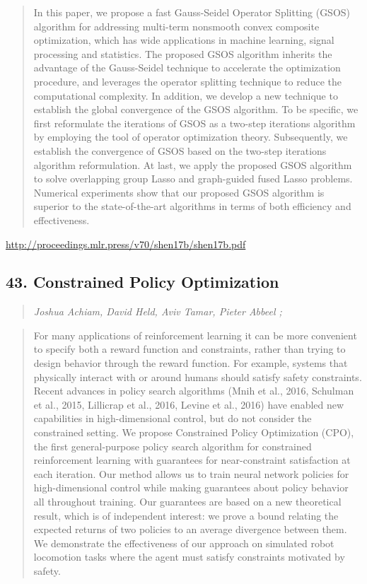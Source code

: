 \documentclass{article}
\begin{document}
\begin{quote}
    In this paper, we propose a fast Gauss-Seidel Operator Splitting (GSOS) algorithm for addressing multi-term nonsmooth convex composite optimization, which has wide applications in machine learning, signal processing and statistics. The proposed GSOS algorithm inherits the advantage of the Gauss-Seidel technique to accelerate the optimization procedure, and leverages the operator splitting technique to reduce the computational complexity. In addition, we develop a new technique to establish the global convergence of the GSOS algorithm. To be specific, we first reformulate the iterations of GSOS as a two-step iterations algorithm by employing the tool of operator optimization theory. Subsequently, we establish the convergence of GSOS based on the two-step iterations algorithm reformulation. At last, we apply the proposed GSOS algorithm to solve overlapping group Lasso and graph-guided fused Lasso problems. Numerical experiments show that our proposed GSOS algorithm is superior to the state-of-the-art algorithms in terms of both efficiency and effectiveness.  
\end{quote}

\href{http://proceedings.mlr.press/v70/shen17b/shen17b.pdf}{http://proceedings.mlr.press/v70/shen17b/shen17b.pdf}

\subsection{43. Constrained Policy Optimization}

\begin{quote}
\footnotesize{\textit{Joshua Achiam, David Held, Aviv Tamar, Pieter Abbeel ;}}

\end{quote}

\begin{quote}
    For many applications of reinforcement learning it can be more convenient to specify both a reward function and constraints, rather than trying to design behavior through the reward function. For example, systems that physically interact with or around humans should satisfy safety constraints. Recent advances in policy search algorithms (Mnih et al., 2016, Schulman et al., 2015, Lillicrap et al., 2016, Levine et al., 2016) have enabled new capabilities in high-dimensional control, but do not consider the constrained setting. We propose Constrained Policy Optimization (CPO), the first general-purpose policy search algorithm for constrained reinforcement learning with guarantees for near-constraint satisfaction at each iteration. Our method allows us to train neural network policies for high-dimensional control while making guarantees about policy behavior all throughout training. Our guarantees are based on a new theoretical result, which is of independent interest: we prove a bound relating the expected returns of two policies to an average divergence between them. We demonstrate the effectiveness of our approach on simulated robot locomotion tasks where the agent must satisfy constraints motivated by safety.  
\end{quote}
\end{document}
